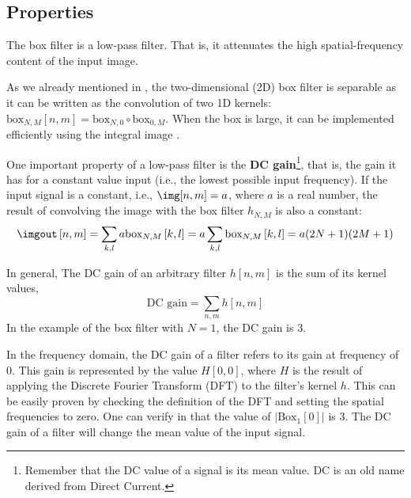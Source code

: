 \subsection{Properties}

The box filter is a low-pass filter. That is, it attenuates the high spatial-frequency content of the input image. 

As we already mentioned in \sect{\ref{sec:box_function}}, the two-dimensional (2D) box filter is separable as it can be written as the convolution of two 1D kernels: $\text{box}_{N,M} \left[n,m \right]  = \text{box}_{N,0} \circ \text{box}_{0,M}$. When the box is large, it can be implemented efficiently using the integral image \cite{Viola01}.


One important property of a low-pass filter is the {\bf DC gain}\footnote{Remember that the DC value of a signal is its mean value. DC is an old name derived from Direct Current.}, that is, the gain it has for a constant value input (i.e., the lowest possible input frequency). If the input signal is a constant, i.e., $\img[n,m] = a$, where $a$ is a real number, the result of convolving the image with the box filter $h_{N,M}$ is also a constant:
\begin{equation}
\imgout \left[n,m\right] = \sum_{k,l} a \text{box}_{N,M} \left[k,l \right] = a \sum_{k,l} \text{box}_{N,M} \left[k,l \right]  = a (2N+1)(2M+1)
\end{equation}

In general, The DC gain of an arbitrary filter $h [n,m]$ is the sum of  its kernel values, 
\begin{equation}
\text{DC~gain} = \sum_{n,m} h [n,m]
\end{equation}
In the example of the box filter with $N=1$, the DC gain is 3. 

In the frequency domain, the DC gain of a filter refers to its gain at frequency of 0. This gain is represented by the value $H[0,0]$, where $H$ is the result of applying the Discrete Fourier Transform (DFT) to the filter's kernel $h$. This can be easily proven by checking the definition of the DFT and setting the spatial frequencies to zero. One can verify in \fig{\ref{fig:boxfilter}} that the value of $\left| \text{Box}_1[0] \right|$ is $3$. The DC gain of a filter will change the mean value of the input signal. 




